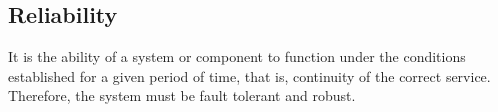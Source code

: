 \subsection{Reliability}
It is the ability of a system or component to function under the conditions established for a given period of time, that is, continuity of the correct service. Therefore, the system must be fault tolerant and robust.